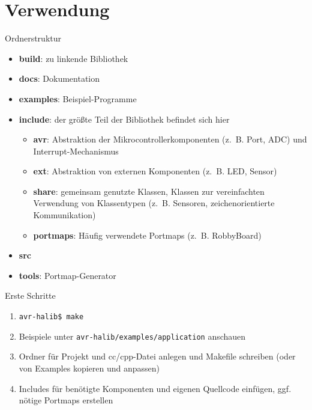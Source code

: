 \documentclass[11pt]{beamer}
\begin{document}
\section{Verwendung}


\begin{frame}{Ordnerstruktur}

\begin{small}\begin{itemize}
	\item \textbf{build}: zu linkende Bibliothek
 	\item \textbf{docs}: Dokumentation
	\item \textbf{examples}: Beispiel-Programme
	\item \textbf{include}: der größte Teil der Bibliothek befindet sich hier 
	\begin{itemize}
		\item \textbf{avr}: Abstraktion der Mikrocontrollerkomponenten (z.~B. Port, ADC) und Interrupt-Mechanismus
		\item \textbf{ext}: Abstraktion von externen Komponenten (z.~B. LED, Sensor)
		\item \textbf{share}: gemeinsam genutzte Klassen, Klassen zur vereinfachten Verwendung von Klassentypen (z.~B. Sensoren, zeichenorientierte Kommunikation)
		\item \textbf{portmaps}: Häufig verwendete Portmaps (z.~B. RobbyBoard)
	\end{itemize}
	\item \textbf{src}
	\item \textbf{tools}: Portmap-Generator
\end{itemize}
\end{small}\end{frame}


\begin{frame}[fragile]{Erste Schritte}
\begin{enumerate}
	\item \verb!avr-halib$ make!
	\item Beispiele unter \verb!avr-halib/examples/application! anschauen
	\item Ordner für Projekt und cc/cpp-Datei anlegen und Makefile schreiben (oder von Examples kopieren und anpassen)
	\item Includes für benötigte Komponenten und eigenen Quellcode einfügen, ggf. nötige Portmaps erstellen
\end{enumerate}
\end{frame}
\end{document}
